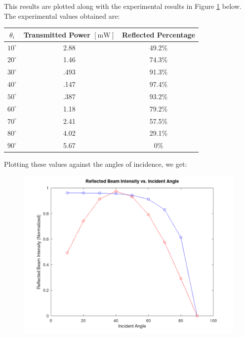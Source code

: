 \documentclass[
	letterpaper, %
	10pt, %
]{CSUniSchoolLabReport}
\begin{document}
This results are plotted along with the experimental results in Figure \ref{fig:1} below.\\

The experimental values obtained are:

\begin{center}
  \begin{tabular}[h!]{|c|c|c|}
    \hline
    $\theta_i$ & Transmitted Power $[\si{\milli\watt}]$ & Reflected Percentage\\
    \hline
    $10^{\circ}$ & 2.88 & 49.2\%\\
    \hline
    $20^{\circ}$ & 1.46 & 74.3\%\\
    \hline
    $30^{\circ}$ & .493 & 91.3\%\\
    \hline
    $40^{\circ}$ & .147 & 97.4\%\\
    \hline
    $50^{\circ}$ & .387 & 93.2\%\\
    \hline
    $60^{\circ}$ & 1.18 & 79.2\%\\
    \hline
    $70^{\circ}$ & 2.41 & 57.5\%\\
    \hline
    $80^{\circ}$ & 4.02 & 29.1\%\\
    \hline
    $90^{\circ}$ & 5.67 & 0\%\\
    \hline
  \end{tabular}
\end{center}

Plotting these values against the angles of incidence, we get:

\begin{figure}[H]
  \centering
  \includegraphics[width=.9\textwidth]{Figures/Lab Seven/Lab7Plot.png}
  \label{fig:1}
\end{figure}
\end{document}
